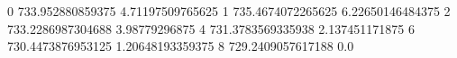 0 733.952880859375 4.71197509765625
1 735.4674072265625 6.22650146484375
2 733.2286987304688 3.98779296875
4 731.3783569335938 2.137451171875
6 730.4473876953125 1.20648193359375
8 729.2409057617188 0.0
